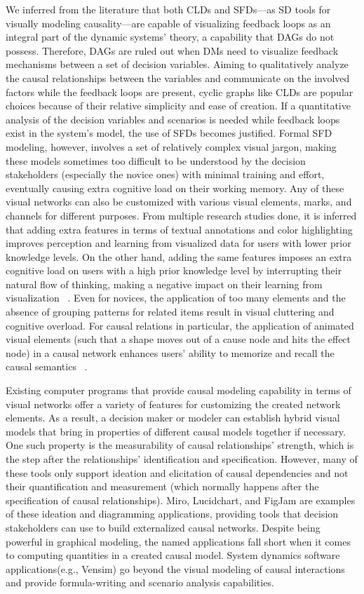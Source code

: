 \documentclass{sfuthesis}
\begin{document}
We inferred from the literature that both CLDs and SFDs—as SD tools for visually modeling causality—are capable of visualizing feedback loops as an integral part of the dynamic systems’ theory, a capability that DAGs do not possess. Therefore, DAGs are ruled out when DMs need to visualize feedback mechanisms between a set of decision variables. Aiming to qualitatively analyze the causal relationships between the variables and communicate on the involved factors while the feedback loops are present, cyclic graphs like CLDs are popular choices because of their relative simplicity and ease of creation. If a quantitative analysis of the decision variables and scenarios is needed while feedback loops exist in the system’s model, the use of SFDs becomes justified. Formal SFD modeling, however, involves a set of relatively complex visual jargon, making these models sometimes too difficult to be understood by the decision stakeholders (especially the novice ones) with minimal training and effort, eventually causing extra cognitive load on their working memory. Any of these visual networks can also be customized with various visual elements, marks, and channels for different purposes. From multiple research studies done, it is inferred that adding extra features in terms of textual annotations and color highlighting improves perception and learning from visualized data for users with lower prior knowledge levels. On the other hand, adding the same features imposes an extra cognitive load on users with a high prior knowledge level by interrupting their natural flow of thinking, making a negative impact on their learning from visualization ~\cite{han2023prior}. Even for novices, the application of too many elements and the absence of grouping patterns for related items result in visual cluttering and cognitive overload. For causal relations in particular, the application of animated visual elements (such that a shape moves out of a cause node and hits the effect node) in a causal network enhances users’ ability to memorize and recall the causal semantics ~\cite{kadaba_visualizing_2007}.\par
Existing computer programs that provide causal modeling capability in terms of visual networks offer a variety of features for customizing the created network elements. As a result, a decision maker or modeler can establish hybrid visual models that bring in properties of different causal models together if necessary. One such property is the measurability of causal relationships’ strength, which is the step after the relationships’ identification and specification. However, many of these tools only support ideation and elicitation of causal dependencies and not their quantification and measurement (which normally happens after the specification of causal relationships). Miro, Lucidchart, and FigJam are examples of these ideation and diagramming applications, providing tools that decision stakeholders can use to build externalized causal networks. Despite being powerful in graphical modeling, the named applications fall short when it comes to computing quantities in a created causal model. System dynamics software applications(e.g., Vensim) go beyond the visual modeling of causal interactions and provide formula-writing and scenario analysis capabilities.
\end{document}
